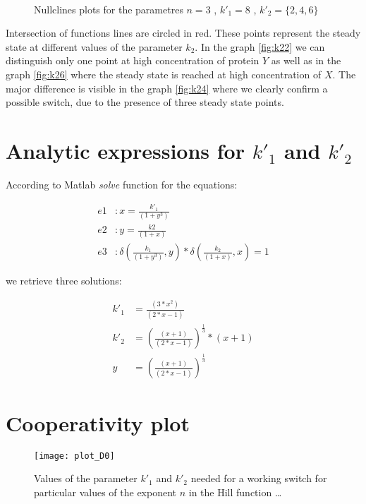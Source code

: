 \begin{figure}[h!]
  \centering
  ~
  ~
  \caption{Nullclines plots for the parametres $n = 3$ , $k'_1 = 8$ , $k'_2 =
  \{2,4,6\}$}
  \label{fig:nullclinesplots}
\end{figure}

Intersection of functions lines are circled in red. These points represent the
steady state at different values of the parameter $k_2$. In the graph
\ref{fig:k22} we can distinguish only one point at high concentration of protein
$Y$ as well as in the graph \ref{fig:k26} where the steady state is reached at
high concentration of $X$. The major difference is visible in the graph
\ref{fig:k24} where we clearly confirm a possible switch, due to the
presence of three steady state points.

\section{Analytic expressions for $k'_1$ and $k'_2$}

According to Matlab \emph{solve} function for the
equations:

\begin{subequations}
	\begin{align}
		e1 &: x = \frac{k'_1}{(1+y^3)}\\
		e2 &: y = \frac{k2}{(1+x)}\\
		e3 &: \delta(\frac{k_1}{(1+y^3)}, y)*\delta(\frac{k_2}{(1+x)},x) = 1
	\end{align}
\end{subequations}



we retrieve three solutions:

\begin{subequations}
	\begin{align}
		k'_1 &=\frac{(3*x^2)}{(2*x - 1)}\\ 
		k'_2 &=\left(\frac{(x + 1)}{(2*x - 1)}\right)^\frac{1}{3}*(x + 1)\\
		y &= \left(\frac{(x + 1)}{(2*x - 1)}\right)^\frac{1}{3}
	\end{align}
\end{subequations}

\section{Cooperativity plot}


\begin{figure}[h]
  	\centering
    \texttt{[image: plot\_D0]}
    \caption{Values of the parameter $k'_1$ and $k'_2$ needed for a working switch
 	for particular values of the exponent $n$ in the Hill function \ldots}
	\label{fig:bifurcatingplot}
\end{figure}
  


